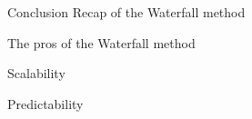 \begin{frame}{Conclusion}
Recap of the Waterfall method

    \begin{alertblock}{The pros of the Waterfall method}
        \item Scalability
        
        \item Predictability
    \end{alertblock}
\end{frame}